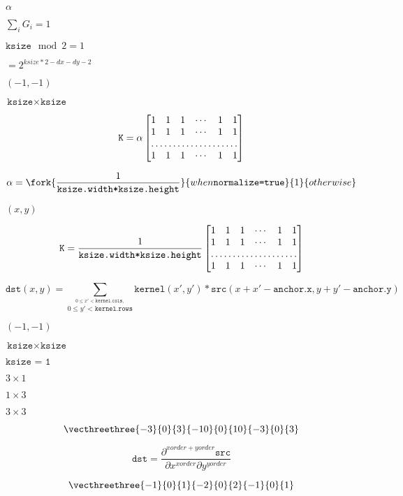 \documentclass{article}
\begin{document}
$\alpha$
\pagebreak

$\sum_i G_i=1$
\pagebreak

$\texttt{ksize} \mod 2 = 1$
\pagebreak

$=2^{ksize*2-dx-dy-2}$
\pagebreak

$(-1, -1)$
\pagebreak

$\texttt{ksize} \times
\texttt{ksize}$
\pagebreak

\[\texttt{K} =  \alpha \begin{bmatrix} 1 & 1 & 1 &  \cdots & 1 & 1  \\ 1 & 1 & 1 &  \cdots & 1 & 1  \\ \hdotsfor{6} \\ 1 & 1 & 1 &  \cdots & 1 & 1 \end{bmatrix}\]
\pagebreak

\[\alpha = \fork{\frac{1}{\texttt{ksize.width*ksize.height}}}{when \texttt{normalize=true}}{1}{otherwise}\]
\pagebreak

$ (x, y) $
\pagebreak

\[\texttt{K} =  \frac{1}{\texttt{ksize.width*ksize.height}} \begin{bmatrix} 1 & 1 & 1 &  \cdots & 1 & 1  \\ 1 & 1 & 1 &  \cdots & 1 & 1  \\ \hdotsfor{6} \\ 1 & 1 & 1 &  \cdots & 1 & 1  \\ \end{bmatrix}\]
\pagebreak

\[\texttt{dst} (x,y) =  \sum _{ \stackrel{0\leq x' < \texttt{kernel.cols},}{0\leq y' < \texttt{kernel.rows}} }  \texttt{kernel} (x',y')* \texttt{src} (x+x'- \texttt{anchor.x} ,y+y'- \texttt{anchor.y} )\]
\pagebreak

$(-1,-1)$
\pagebreak

$\texttt{ksize} \times \texttt{ksize}$
\pagebreak

$\texttt{ksize = 1}$
\pagebreak

$3 \times 1$
\pagebreak

$1 \times 3$
\pagebreak

$3\times3$
\pagebreak

\[\vecthreethree{-3}{0}{3}{-10}{0}{10}{-3}{0}{3}\]
\pagebreak

\[\texttt{dst} =  \frac{\partial^{xorder+yorder} \texttt{src}}{\partial x^{xorder} \partial y^{yorder}}\]
\pagebreak

\[\vecthreethree{-1}{0}{1}{-2}{0}{2}{-1}{0}{1}\]
\pagebreak
\end{document}
